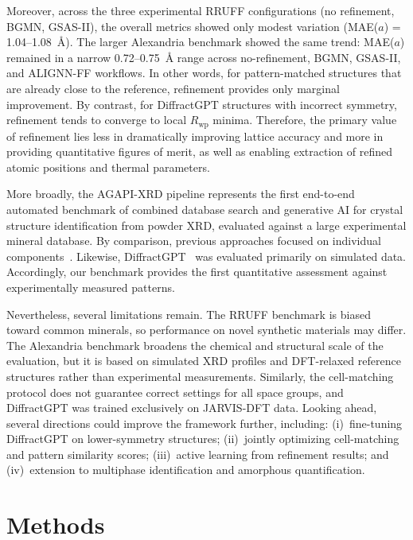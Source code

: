 \documentclass[pdflatex,sn-mathphys-num]{sn-jnl}
\theoremstyle{thmstyleone}
\theoremstyle{thmstyletwo}
\theoremstyle{thmstylethree}
\begin{document}
Moreover, across the three experimental RRUFF configurations (no refinement, BGMN, GSAS-II), the overall metrics showed only modest variation (MAE($a$) = 1.04--1.08~\AA). The larger Alexandria benchmark showed the same trend: MAE($a$) remained in a narrow 0.72--0.75~\AA{} range across no-refinement, BGMN, GSAS-II, and ALIGNN-FF workflows. In other words, for pattern-matched structures that are already close to the reference, refinement provides only marginal improvement. By contrast, for DiffractGPT structures with incorrect symmetry, refinement tends to converge to local $R_{\mathrm{wp}}$ minima. Therefore, the primary value of refinement lies less in dramatically improving lattice accuracy and more in providing quantitative figures of merit, as well as enabling extraction of refined atomic positions and thermal parameters.

More broadly, the AGAPI-XRD pipeline represents the first end-to-end automated benchmark of combined database search and generative AI for crystal structure identification from powder XRD, evaluated against a large experimental mineral database. By comparison, previous approaches focused on individual components~\cite{park2017, lee2020xrd, vecsei2019}. Likewise, DiffractGPT~\cite{diffractgpt2025} was evaluated primarily on simulated data. Accordingly, our benchmark provides the first quantitative assessment against experimentally measured patterns.

Nevertheless, several limitations remain. The RRUFF benchmark is biased toward common minerals, so performance on novel synthetic materials may differ. The Alexandria benchmark broadens the chemical and structural scale of the evaluation, but it is based on simulated XRD profiles and DFT-relaxed reference structures rather than experimental measurements. Similarly, the cell-matching protocol does not guarantee correct settings for all space groups, and DiffractGPT was trained exclusively on JARVIS-DFT data. Looking ahead, several directions could improve the framework further, including: (i)~fine-tuning DiffractGPT on lower-symmetry structures; (ii)~jointly optimizing cell-matching and pattern similarity scores; (iii)~active learning from refinement results; and (iv)~extension to multiphase identification and amorphous quantification.


\section{Methods}\label{sec:methods}                                                                                                                                            
                                                                                                                                                                                  
\end{document}
